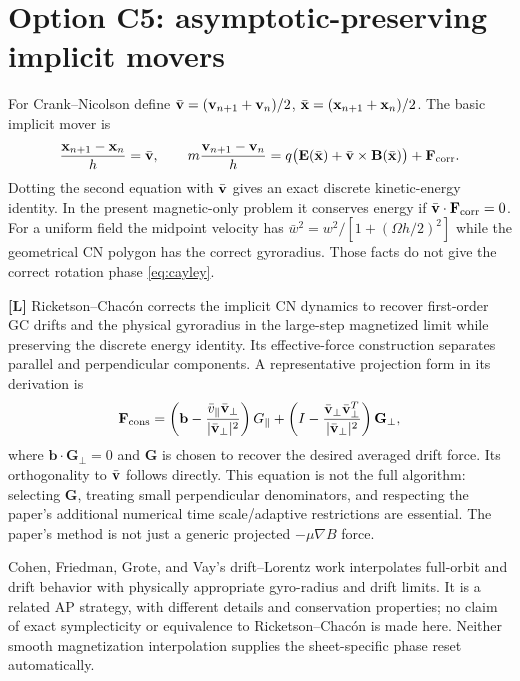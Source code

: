 \documentclass[10pt,a4paper]{article}
\newcommand{\B}{\mathbf B}\newcommand{\bunit}{\mathbf b}
\newcommand{\lit}{\textbf{[L]}}
\begin{document}
\section{Option C5: asymptotic-preserving implicit movers}
\label{sec:ap}
For Crank--Nicolson define $\bar{\mathbf v}=(\mathbf v_{n+1}+\mathbf v_n)/2$, $\bar{\mathbf x}=(\mathbf x_{n+1}+\mathbf x_n)/2$. The basic implicit mover is
\begin{equation}\label{eq:cn}
 \frac{\x_{n+1}-\x_n}{h}=\bar\v,\qquad
 m\frac{\v_{n+1}-\v_n}{h}
 =q\bigl(\mathbf E(\bar\x)+\bar\v\times\B(\bar\x)\bigr)+\mathbf F_{\rm corr}.
\end{equation}
Dotting the second equation with $\bar{\mathbf v}$ gives an exact discrete kinetic-energy identity. In the present magnetic-only problem it conserves energy if $\bar{\mathbf v}\cdot\mathbf F_{\rm corr}=0$. For a uniform field the midpoint velocity has $\bar w^2=w^2/[1+(\Omega h/2)^2]$ while the geometrical CN polygon has the correct gyroradius. Those facts do not give the correct rotation phase \eqref{eq:cayley}.

\lit{} Ricketson--Chac\'on \cite{ricketson} corrects the implicit CN dynamics to recover first-order GC drifts and the physical gyroradius in the large-step magnetized limit while preserving the discrete energy identity. Its effective-force construction separates parallel and perpendicular components. A representative projection form in its derivation is
\begin{equation}\label{eq:rcforce}
 \mathbf F_{\rm cons}=
 \left(\bunit-\frac{\bar v_\parallel\bar\v_\perp}{|\bar\v_\perp|^2}\right)G_\parallel
 +\left(I-\frac{\bar\v_\perp\bar\v_\perp^T}{|\bar\v_\perp|^2}\right)\mathbf G_\perp,
\end{equation}
where $\bunit\cdot\mathbf G_\perp=0$ and $\mathbf G$ is chosen to recover the desired averaged drift force. Its orthogonality to $\bar{\mathbf v}$ follows directly. This equation is not the full algorithm: selecting $\mathbf G$, treating small perpendicular denominators, and respecting the paper's additional numerical time scale/adaptive restrictions are essential. The paper's method is not just a generic projected $-\mu\nabla B$ force.

Cohen, Friedman, Grote, and Vay's drift--Lorentz work \cite{cohen07,cohen09} interpolates full-orbit and drift behavior with physically appropriate gyro-radius and drift limits. It is a related AP strategy, with different details and conservation properties; no claim of exact symplecticity or equivalence to Ricketson--Chac\'on is made here. Neither smooth magnetization interpolation supplies the sheet-specific phase reset automatically.
\end{document}
